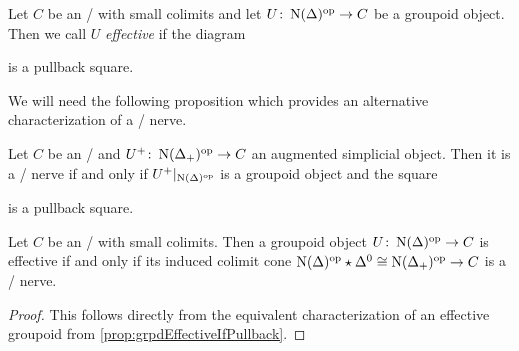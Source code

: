 \begin{definition}
    Let $C$ be an \inftycat/ with small colimits and let $U\colon\operatorname{N}(\Delta)^{\operatorname{op}}\to C$ be a groupoid object.
    Then we call $U$ \emph{effective} if the diagram 
    \begin{center} %
    \end{center}
    is a pullback square.
\end{definition}
We will need the following proposition which provides an alternative characterization of a \Cech/ nerve.
\begin{prop}\label{prop:grpdEffectiveIfPullback} 
    Let $C$ be an \inftycat/ and $U^+\colon\operatorname{N}(\Delta_+)^{\operatorname{op}}\to C$ an augmented simplicial object.
    Then it is a \Cech/ nerve if and only if $U^+|_{\operatorname{N}(\Delta)^{\operatorname{op}}}$ is a groupoid object and the square
    \begin{center}
    \end{center}
    is a pullback square.
    \begin{reference}
        \cite[Proposition 6.1.2.11]{HTT}
    \end{reference}
\end{prop}
\begin{corollary}\label{cor:groupoidEffectiveIffColimCechNerve}
    Let $C$ be an \inftycat/ with small colimits. 
    Then a groupoid object $U\colon\operatorname{N}(\Delta)^{\operatorname{op}}\to C$ is effective if and only if its induced colimit cone $\operatorname{N}(\Delta)^{\operatorname{op}}\star\Delta^0\cong\operatorname{N}(\Delta_+)^{\operatorname{op}}\to C$ is a \Cech/ nerve.
    \begin{proof}
        This follows directly from the equivalent characterization of an effective groupoid from \cref{prop:grpdEffectiveIfPullback}.
    \end{proof}
\end{corollary}
